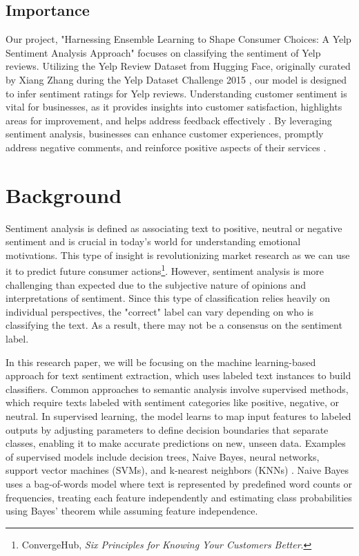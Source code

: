 \documentclass[12pt]{article}
\begin{document}
\subsection{Importance}
Our project, "Harnessing Ensemble Learning to Shape Consumer Choices: A Yelp Sentiment Analysis Approach" focuses on classifying the sentiment of Yelp reviews. Utilizing the Yelp Review Dataset from Hugging Face, originally curated by Xiang Zhang during the Yelp Dataset Challenge 2015 \citep{zhang2015sensitivity}, our model is designed to infer sentiment ratings for Yelp reviews. Understanding customer sentiment is vital for businesses, as it provides insights into customer satisfaction, highlights areas for improvement, and helps address feedback effectively \citep{jurafsky2020speech}. By leveraging sentiment analysis, businesses can enhance customer experiences, promptly address negative comments, and reinforce positive aspects of their services \citep{pang2008sentiment}.

\section{Background}
Sentiment analysis is defined as associating text to positive, neutral or negative sentiment and is crucial in today's world for understanding emotional motivations. This type of insight is revolutionizing market research as we can use it to predict future consumer actions\footnote{ConvergeHub, \textit{Six Principles for Knowing Your Customers Better}.}. However, sentiment analysis is more challenging than expected due to the subjective nature of opinions and interpretations of sentiment. Since this type of classification relies heavily on individual perspectives, the "correct" label can vary depending on who is classifying the text. As a result, there may not be a consensus on the sentiment label.

In this research paper, we will be focusing on the machine learning-based approach for text sentiment extraction, which uses labeled text instances to build classifiers. Common approaches to semantic analysis involve supervised methods, which require texts labeled with sentiment categories like positive, negative, or neutral. In supervised learning, the model learns to map input features to labeled outputs by adjusting parameters to define decision boundaries that separate classes, enabling it to make accurate predictions on new, unseen data. Examples of supervised models include decision trees, Naive Bayes, neural networks, support vector machines (SVMs), and k-nearest neighbors (KNNs) \citep{dankhara2022}. Naive Bayes uses a bag-of-words model where text is represented by predefined word counts or frequencies, treating each feature independently and estimating class probabilities using Bayes' theorem while assuming feature independence.
\end{document}
